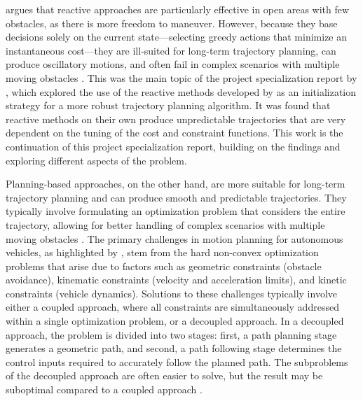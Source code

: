 \citet{Wang2019} argues that reactive approaches are particularly effective in open areas with few obstacles, as there is more freedom to maneuver.
However, because they base decisions solely on the current state---selecting greedy actions that minimize an instantaneous cost---they are ill-suited for long-term trajectory planning, can produce oscillatory motions, and often fail in complex scenarios with multiple moving obstacles \citep{Liu2024-VO-Traj}. This was the main topic of the project specialization report by \cite{prosjektoppgave}, which explored the use of the reactive methods developed by \citet{Thyri2022-VO} as an initialization strategy for a more robust trajectory planning algorithm. It was found that reactive methods on their own produce unpredictable trajectories that are very dependent on the tuning of the cost and constraint functions. This work is the continuation of this project specialization report, building on the findings and exploring different aspects of the problem.

Planning-based approaches, on the other hand, are more suitable for long-term trajectory planning and can produce smooth and predictable trajectories. They typically involve formulating an optimization problem that considers the entire trajectory, allowing for better handling of complex scenarios with multiple moving obstacles \citep{Liu2024-VO-Traj}.
The primary challenges in motion planning for autonomous vehicles, as highlighted by \citet{mercy2016spline}, stem from the hard non-convex optimization problems that arise due to factors such as geometric constraints (obstacle avoidance), kinematic constraints (velocity and acceleration limits), and kinetic constraints (vehicle dynamics). Solutions to these challenges typically involve either a coupled approach, where all constraints are simultaneously addressed within a single optimization problem, or a decoupled approach. In a decoupled approach, the problem is divided into two stages: first, a path planning stage generates a geometric path, and second, a path following stage determines the control inputs required to accurately follow the planned path. The subproblems of the decoupled approach are often easier to solve, but the result may be suboptimal compared to a coupled approach \citep{mercy2016spline}.

